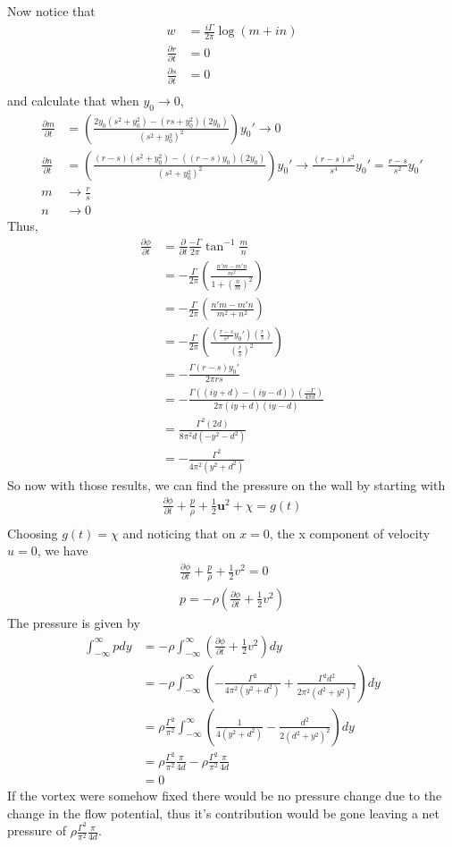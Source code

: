 \documentclass[12pt]{article}
\newcommand{\eq}[1]{\begin{align*}#1\end{align*}}
\newcommand{\p}[2]{\frac{\partial#1}{\partial#2}}
\begin{document}
Now notice that
\eq{
	w &= \frac{i\Gamma}{2\pi}\log(m + in)\\
	\p{r}{t} &= 0\\
	\p{s}{t} &= 0\\
}
and calculate that when $y_0 \rightarrow 0$,
\eq{
	\p{m}{t} &= \left(\frac{2y_0(s^2 + y_0^2) - (rs + y_0^2)(2y_0)}{(s^2 + y_0^2)^2}\right)y_0' \rightarrow 0\\
	\p{n}{t} &= \left( \frac{(r-s)(s^2 + y_0^2) - ((r-s)y_0)(2y_0)}{(s^2 + y_0^2)^2} \right)y_0' \rightarrow \frac{(r-s)s^2}{s^4}y_0' = \frac{r-s}{s^2}y_0'\\
	m &\rightarrow \frac{r}{s}\\
	n &\rightarrow 0
}
Thus,
\eq{
	\p{\phi}{t} &= \p{}{t}\frac{-\Gamma}{2\pi}\tan^{-1}\frac{m}{n}\\
	&= -\frac{\Gamma}{2\pi}\left( \frac{\frac{n'm - m'n}{m^2}}{1 + (\frac{n}{m})^2}\right)\\
	&= -\frac{\Gamma}{2\pi}\left( \frac{n'm - m'n}{m^2 + n^2}\right)\\
	&= -\frac{\Gamma}{2\pi}\left( \frac{\left(\frac{r-s}{s^2}y_0'\right)(\frac{r}{s})}{(\frac{r}{s})^2}\right)\\
	&= -\frac{\Gamma(r-s)y_0'}{2\pi rs}\\
	&= -\frac{\Gamma((iy + d) - (iy - d)) \left(\frac{-\Gamma}{4\pi d}\right) }{2\pi (iy + d)(iy - d)}\\
	&= \frac{\Gamma^2(2d)}{8\pi^2 d(-y^2 - d^2)}\\
	&= -\frac{\Gamma^2}{4\pi^2(y^2 + d^2)}
}
So now with those results, we can find the pressure on the wall by starting with
\eq{
	\p{\phi}{t} + \frac{p}{\rho} + \frac{1}{2}\bm{u}^2 + \chi = g(t)\\
}
Choosing $g(t) = \chi$ and noticing that on $x = 0$, the x component of velocity $u = 0$, we have
\eq{
	\p{\phi}{t} + \frac{p}{\rho} + \frac{1}{2}v^2 = 0\\
	p = -\rho\left(\p{\phi}{t} + \frac{1}{2}v^2\right)
}
The pressure is given by
\eq{
	\int_{-\infty}^\infty p dy &= -\rho\int_{-\infty}^\infty\left(\p{\phi}{t} + \frac{1}{2}v^2\right)dy\\
	&= -\rho\int_{-\infty}^\infty\left(-\frac{\Gamma^2}{4\pi^2(y^2 + d^2)} + \frac{\Gamma^2 d^2}{2\pi^2(d^2 + y^2)^2}\right)dy\\
	&= \rho\frac{\Gamma^2}{\pi^2}\int_{-\infty}^\infty\left(\frac{1}{4(y^2 + d^2)} - \frac{d^2}{2(d^2 + y^2)^2}\right)dy\\
	&= \rho\frac{\Gamma^2}{\pi^2}\frac{\pi}{4d} - \rho\frac{\Gamma^2}{\pi^2}\frac{\pi}{4d}\\
	&= 0
}
If the vortex were somehow fixed there would be no pressure change due to the change in the flow potential, thus it's contribution would be gone leaving a net pressure of $\rho\frac{\Gamma^2}{\pi^2}\frac{\pi}{4d}$.
\end{document}

